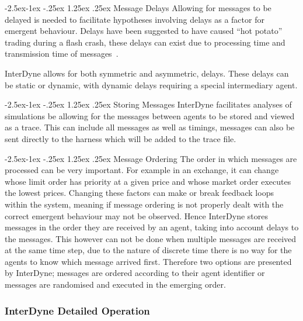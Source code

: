 \documentclass{article}
\makeatletter
\renewcommand\paragraph{\@startsection{paragraph}{4}{\z@}%
	{-2.5ex\@plus -1ex \@minus -.25ex}%
	{1.25ex \@plus .25ex}%
	{\normalfont\normalsize\bfseries}}
\makeatother
\begin{document}
\paragraph{Message Delays}
Allowing for messages to be delayed is needed to facilitate hypotheses involving delays as a factor for emergent behaviour. Delays have been suggested to have caused ``hot potato'' trading during a flash crash, these delays can exist due to processing time and transmission time of messages~\cite{SECreport_delays}.

InterDyne allows for both symmetric and asymmetric, delays. These delays can be static or dynamic, with dynamic delays requiring a special intermediary agent. 

\paragraph{Storing Messages}
InterDyne facilitates analyses of simulations be allowing for the messages between agents to be stored and viewed as a trace. This can include all messages as well as timings, messages can also be sent directly to the harness which will be added to the trace file. 
  
\paragraph{Message Ordering}
The order in which messages are processed can be very important. For example in an exchange, it can change whose limit order has priority at a given price and whose market order executes the lowest prices. Changing these factors can make or break feedback loops within the system, meaning if message ordering is not properly dealt with the correct emergent behaviour may not be observed. Hence InterDyne stores messages in the order they are received by an agent, taking into account delays to the messages. This however can not be done when multiple messages are received at the same time step, due to the nature of discrete time there is no way for the agents to know which message arrived first. Therefore two options are presented by InterDyne; messages are ordered according to their agent identifier or messages are randomised and executed in the emerging order.



\subsubsection{InterDyne Detailed Operation}
\end{document}
